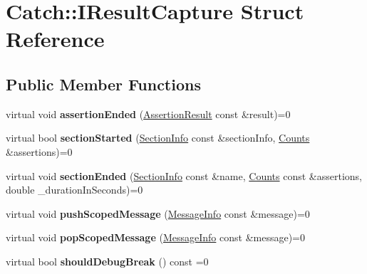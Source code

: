 \hypertarget{structCatch_1_1IResultCapture}{}\section{Catch\+:\+:I\+Result\+Capture Struct Reference}
\label{structCatch_1_1IResultCapture}
\subsection*{Public Member Functions}
\begin{DoxyCompactItemize}
\item 
virtual void {\bfseries assertion\+Ended} (\hyperlink{classCatch_1_1AssertionResult}{Assertion\+Result} const \&result)=0\hypertarget{structCatch_1_1IResultCapture_ae45e08bccc5fb434656d4f2e44742223}{}\label{structCatch_1_1IResultCapture_ae45e08bccc5fb434656d4f2e44742223}

\item 
virtual bool {\bfseries section\+Started} (\hyperlink{structCatch_1_1SectionInfo}{Section\+Info} const \&section\+Info, \hyperlink{structCatch_1_1Counts}{Counts} \&assertions)=0\hypertarget{structCatch_1_1IResultCapture_a5b76ed52badcb64cf374202e12b81a03}{}\label{structCatch_1_1IResultCapture_a5b76ed52badcb64cf374202e12b81a03}

\item 
virtual void {\bfseries section\+Ended} (\hyperlink{structCatch_1_1SectionInfo}{Section\+Info} const \&name, \hyperlink{structCatch_1_1Counts}{Counts} const \&assertions, double \+\_\+duration\+In\+Seconds)=0\hypertarget{structCatch_1_1IResultCapture_a110d3d300709d114b3e4718fff021b29}{}\label{structCatch_1_1IResultCapture_a110d3d300709d114b3e4718fff021b29}

\item 
virtual void {\bfseries push\+Scoped\+Message} (\hyperlink{structCatch_1_1MessageInfo}{Message\+Info} const \&message)=0\hypertarget{structCatch_1_1IResultCapture_a91d154c1e087e383dcde5aad95cb6a05}{}\label{structCatch_1_1IResultCapture_a91d154c1e087e383dcde5aad95cb6a05}

\item 
virtual void {\bfseries pop\+Scoped\+Message} (\hyperlink{structCatch_1_1MessageInfo}{Message\+Info} const \&message)=0\hypertarget{structCatch_1_1IResultCapture_a42bcb13276706bf8c3ce081ce16d37fd}{}\label{structCatch_1_1IResultCapture_a42bcb13276706bf8c3ce081ce16d37fd}

\item 
virtual bool {\bfseries should\+Debug\+Break} () const =0\hypertarget{structCatch_1_1IResultCapture_a7839e422ccd55f298cd64f0bf4a5938b}{}\label{structCatch_1_1IResultCapture_a7839e422ccd55f298cd64f0bf4a5938b}


\end{DoxyCompactItemize}
